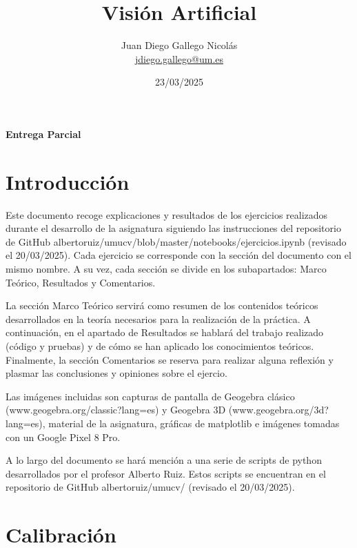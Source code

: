 \documentclass[12pt]{article}
\title{\Huge Visión Artificial}
\author{\Large Juan Diego Gallego Nicolás\\ \href{mailto:jdiego.gallego@um.es}{jdiego.gallego@um.es}}
\date{\Large 23/03/2025}
\begin{document}
\maketitle
\thispagestyle{empty}

\begin{center}
    \vspace{2cm}
    \textbf{Entrega Parcial}
\end{center}

\newpage

\tableofcontents
\newpage

\listoffigures
\newpage

\section{Introducción}
Este documento recoge explicaciones y resultados de los ejercicios realizados durante el desarrollo de la asignatura
siguiendo las instrucciones del repositorio de GitHub albertoruiz/umucv/blob/master/notebooks/ejercicios.ipynb (revisado el 20/03/2025).
Cada ejercicio se corresponde con la sección del documento con el mismo nombre.
A su vez, cada sección se divide en los subapartados: Marco Teórico, Resultados y Comentarios.

La sección Marco Teórico servirá como resumen de los contenidos teóricos desarrollados en la teoría necesarios para la realización de la práctica. 
A continuación, en el apartado de Resultados se hablará del trabajo realizado (código y pruebas) y de cómo se han aplicado los conocimientos teóricos.
Finalmente, la sección Comentarios se reserva para realizar alguna reflexión y plasmar las conclusiones y opiniones sobre el ejercio.

Las imágenes incluidas son capturas de pantalla de Geogebra clásico (www.geogebra.org/classic?lang=es) y Geogebra 3D (www.geogebra.org/3d?lang=es), material de la asignatura, gráficas de matplotlib e imágenes tomadas con un Google Pixel 8 Pro.

A lo largo del documento se hará mención a una serie de scripts de python desarrollados por el profesor Alberto Ruiz. Estos scripts se encuentran en el repositorio de GitHub albertoruiz/umucv/ (revisado el 20/03/2025).

\newpage

\section{Calibración}
\end{document}

